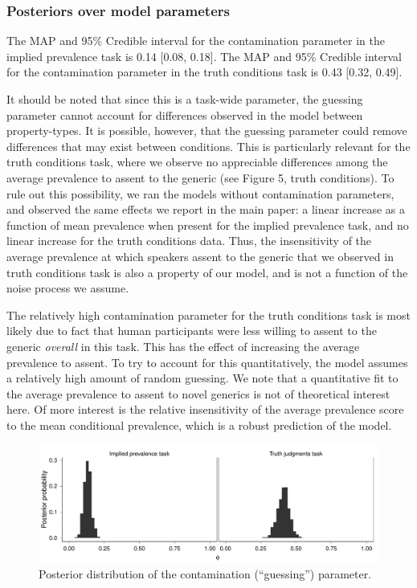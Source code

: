 \documentclass[10pt,letterpaper]{article}
\begin{document}
\subsubsection{Posteriors over model parameters}

The MAP and 95\% Credible interval for the contamination parameter in the implied prevalence task is 0.14 [0.08, 0.18]. 
The MAP and 95\% Credible interval for the contamination parameter in the truth conditions task is 0.43 [0.32, 0.49]. 

It should be noted that since this is a task-wide parameter, the guessing parameter cannot account for differences observed in the model between property-types.
It is possible, however, that the guessing parameter could remove differences that may exist between conditions. 
This is particularly relevant for the truth conditions task, where we observe no appreciable differences among the average prevalence to assent to the generic (see Figure 5, truth conditions). 
To rule out this possibility, we ran the models without contamination parameters, and observed the same effects we report in the main paper: a linear increase as a function of mean prevalence when present for the implied prevalence task, and no linear increase for the truth conditions data. 
Thus, the insensitivity of the average prevalence at which speakers assent to the generic that we observed in truth conditions task is also a property of our model, and is not a function of the noise process we assume.

The relatively high contamination parameter for the truth conditions task is most likely due to fact that human participants were less willing to assent to the generic \emph{overall} in this task.
This has the effect of increasing the average prevalence to assent. 
To try to account for this quantitatively, the model assumes a relatively high amount of random guessing. 
We note that a quantitative fit to the average prevalence to assent to novel generics is not of theoretical interest here. 
Of more interest is the relative insensitivity of the average prevalence score to the mean conditional prevalence, which is a robust prediction of the model. 


\begin{figure}
\centering
    \includegraphics[width=0.8\columnwidth]{asymmetry-phi-3x50k.pdf}
    \caption{Posterior distribution of the contamination (``guessing'') parameter.}
  \label{fig:phi2}
\end{figure}
\end{document}
